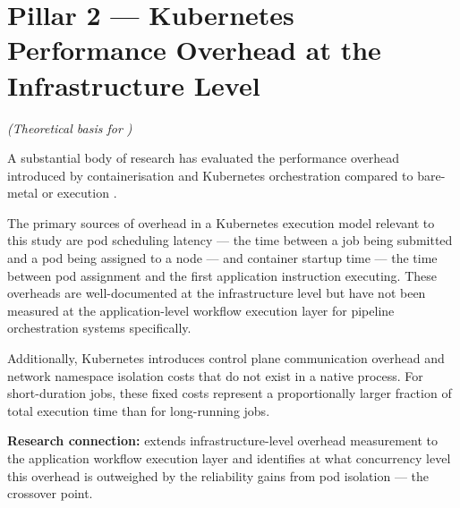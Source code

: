 \section{Pillar 2 --- Kubernetes Performance Overhead at the Infrastructure Level}
\textit{(Theoretical basis for )}

A substantial body of research has evaluated the performance overhead introduced by
containerisation and Kubernetes orchestration compared to bare-metal or \vm{} execution
\citep{cilic2023, liu2024}.

The primary sources of overhead in a Kubernetes execution model relevant to this study are
pod scheduling latency --- the time between a job being submitted and a pod being assigned
to a node --- and container startup time --- the time between pod assignment and the first
application instruction executing. These overheads are well-documented at the infrastructure
level but have not been measured at the application-level workflow execution layer for
pipeline orchestration systems specifically.

Additionally, Kubernetes introduces control plane communication overhead and network
namespace isolation costs that do not exist in a native \vm{} process. For short-duration
jobs, these fixed costs represent a proportionally larger fraction of total execution time
than for long-running jobs.

\textbf{Research connection:}  extends infrastructure-level overhead measurement to
the application workflow execution layer and identifies at what concurrency level this
overhead is outweighed by the reliability gains from pod isolation --- the crossover point.
